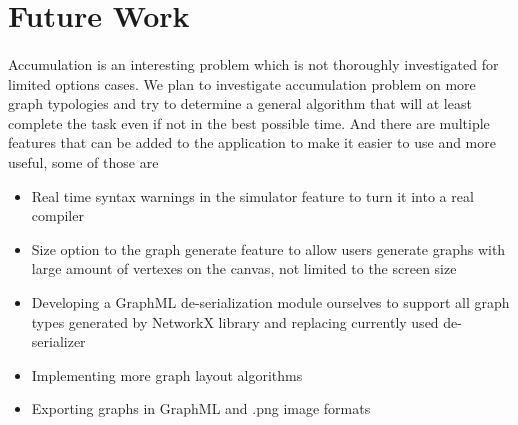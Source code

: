 \documentclass[a4paper,TexShade]{class}
\begin{document}
\newpage
\section{Future Work}
\paragraph{} Accumulation is an interesting problem which is not thoroughly investigated for limited options cases. We plan to investigate accumulation problem on more graph typologies and try to determine a general algorithm that will at least complete the task even if not in the best possible time.
And there are multiple features that can be added to the application to make it easier to use and more useful, some of those are
\bigskip

\begin{itemize}
\item Real time syntax warnings in the simulator feature to turn it into a real compiler
\item Size option to the graph generate feature to allow users generate graphs with large amount of vertexes on the canvas, not limited to the screen size
\item Developing a GraphML de-serialization module ourselves to support all graph types generated by NetworkX library and replacing currently used de-serializer
\item Implementing more graph layout algorithms 
\item Exporting graphs in GraphML and .png image formats
\end{itemize}




\end{document}
